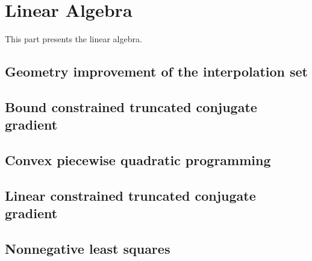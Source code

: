 \documentclass[letterpaper,10pt,english]{sphinxmanual}
\begin{document}
\chapter{Linear Algebra}
\label{\detokenize{algo/linalg:linear-algebra}}\label{\detokenize{algo/linalg:linalg}}\label{\detokenize{algo/linalg::doc}}
\sphinxAtStartPar
This part presents the linear algebra.


\section{Geometry improvement of the interpolation set}
\label{\detokenize{algo/linalg.altmov:geometry-improvement-of-the-interpolation-set}}\label{\detokenize{algo/linalg.altmov:linalg-altmov}}\label{\detokenize{algo/linalg.altmov::doc}}

\section{Bound constrained truncated conjugate gradient}
\label{\detokenize{algo/linalg.bvtcg:bound-constrained-truncated-conjugate-gradient}}\label{\detokenize{algo/linalg.bvtcg:linalg-bvtcg}}\label{\detokenize{algo/linalg.bvtcg::doc}}

\section{Convex piecewise quadratic programming}
\label{\detokenize{algo/linalg.cpqp:convex-piecewise-quadratic-programming}}\label{\detokenize{algo/linalg.cpqp:linalg-cpqp}}\label{\detokenize{algo/linalg.cpqp::doc}}

\section{Linear constrained truncated conjugate gradient}
\label{\detokenize{algo/linalg.lctcg:linear-constrained-truncated-conjugate-gradient}}\label{\detokenize{algo/linalg.lctcg:linalg-lctcg}}\label{\detokenize{algo/linalg.lctcg::doc}}

\section{Nonnegative least squares}
\label{\detokenize{algo/linalg.nnls:nonnegative-least-squares}}\label{\detokenize{algo/linalg.nnls:linalg-nnls}}\label{\detokenize{algo/linalg.nnls::doc}}


\renewcommand{\indexname}{Index}
\printindex
\end{document}
